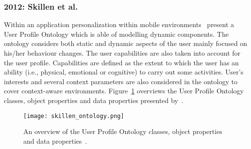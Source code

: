 
\subsubsection{2012: Skillen et al.}
\label{sec:skillen}

Within an application personalization within mobile 
environments~\citet{skillen2012ontological} present a User Profile Ontology 
which is able of modelling dynamic components. The ontology considers both 
static and dynamic aspects of the user mainly focused on his/her behaviour 
changes. The user capabilities are also taken into account for the user profile. 
Capabilities are defined as the extent to which the user has an ability (i.e., 
physical, emotional or cognitive) to carry out some activities. User's interests 
and several context parameters are also considered in the ontology to cover 
context-aware environments. Figure~\ref{fig:skillen_ontology} overviews the 
User Profile Ontology classes, object properties and data properties presented 
by~\citeauthor{skillen2012ontological}.

\begin{figure}
\centering
\texttt{[image: skillen\_ontology.png]}
\caption{An overview of the User Profile Ontology classes, object properties and 
data properties~\citep{skillen2012ontological}.}
\label{fig:skillen_ontology}
\end{figure}